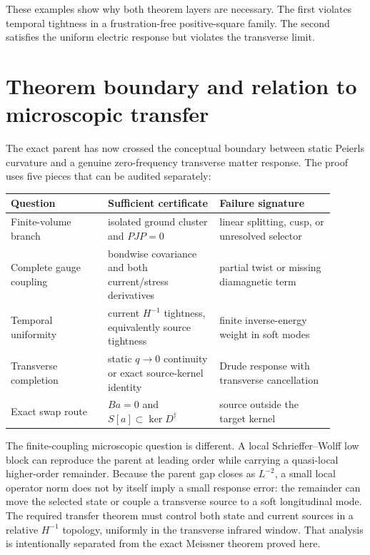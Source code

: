\documentclass[11pt]{article}
\theoremstyle{definition}
\theoremstyle{remark}
\begin{document}
These examples show why both theorem layers are necessary.  The first violates temporal tightness in a
frustration-free positive-square family.  The second satisfies the uniform electric response but violates
the transverse limit.

\section{Theorem boundary and relation to microscopic transfer}
\label{sec:boundary}

The exact parent has now crossed the conceptual boundary between static Peierls curvature and a genuine
zero-frequency transverse matter response.  The proof uses five pieces that can be audited separately:

\begin{center}
\begin{tabular}{@{}>{\raggedright\arraybackslash}p{0.27\linewidth}>{\raggedright\arraybackslash}p{0.31\linewidth}>{\raggedright\arraybackslash}p{0.32\linewidth}@{}}
\toprule
Question & Sufficient certificate & Failure signature\\
\midrule
Finite-volume branch
& isolated ground cluster and $PJP=0$
& linear splitting, cusp, or unresolved selector\\
Complete gauge coupling
& bondwise covariance and both current/stress derivatives
& partial twist or missing diamagnetic term\\
Temporal uniformity
& current $H^{-1}$ tightness, equivalently source tightness
& finite inverse-energy weight in soft modes\\
Transverse completion
& static $q\to0$ continuity or exact source-kernel identity
& Drude response with transverse cancellation\\
Exact swap route
& $Ba=0$ and $S[a]\subset\ker D^\dagger$
& source outside the target kernel\\
\bottomrule
\end{tabular}
\end{center}

The finite-coupling microscopic question is different.  A local Schrieffer--Wolff low block can reproduce
the parent at leading order while carrying a quasi-local higher-order remainder.  Because the parent gap
closes as $L^{-2}$, a small local operator norm does not by itself imply a small response error: the
remainder can move the selected state or couple a transverse source to a soft longitudinal mode.  The
required transfer theorem must control both state and current sources in a relative $H^{-1}$ topology,
uniformly in the transverse infrared window.  That analysis is intentionally separated from the exact
Meissner theorem proved here.
\end{document}
